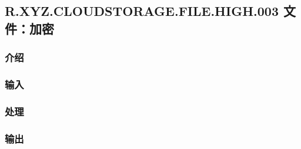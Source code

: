 
\subsection{R.XYZ.CLOUDSTORAGE.FILE.HIGH.003 文件：加密}

\subsubsection{介绍}


\subsubsection{输入} 

\subsubsection{处理} 

\subsubsection{输出} 


